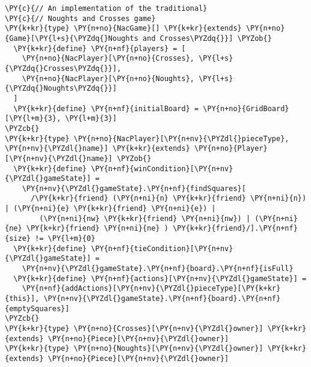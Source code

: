 \begin{Verbatim}[commandchars=\\\{\}]
\PY{c}{// An implementation of the traditional}
\PY{c}{// Noughts and Crosses game}
\PY{k+kr}{type} \PY{n+no}{NacGame}[] \PY{k+kr}{extends} \PY{n+no}{Game}[\PY{l+s}{\PYZdq{}Noughts and Crosses\PYZdq{}}] \PYZob{}
  \PY{k+kr}{define} \PY{n+nf}{players} = [
    \PY{n+no}{NacPlayer}[\PY{n+no}{Crosses}, \PY{l+s}{\PYZdq{}Crosses\PYZdq{}}],
    \PY{n+no}{NacPlayer}[\PY{n+no}{Noughts}, \PY{l+s}{\PYZdq{}Noughts\PYZdq{}}]
  ]
  \PY{k+kr}{define} \PY{n+nf}{initialBoard} = \PY{n+no}{GridBoard}[\PY{l+m}{3}, \PY{l+m}{3}]
\PYZcb{}
\PY{k+kr}{type} \PY{n+no}{NacPlayer}[\PY{n+nv}{\PYZdl{}pieceType}, \PY{n+nv}{\PYZdl{}name}] \PY{k+kr}{extends} \PY{n+no}{Player}[\PY{n+nv}{\PYZdl{}name}] \PYZob{}
  \PY{k+kr}{define} \PY{n+nf}{winCondition}[\PY{n+nv}{\PYZdl{}gameState}] =
    \PY{n+nv}{\PYZdl{}gameState}.\PY{n+nf}{findSquares}[
      /\PY{k+kr}{friend} (\PY{n+ni}{n} \PY{k+kr}{friend} \PY{n+ni}{n}) | (\PY{n+ni}{e} \PY{k+kr}{friend} \PY{n+ni}{e}) |
        (\PY{n+ni}{nw} \PY{k+kr}{friend} \PY{n+ni}{nw}) | (\PY{n+ni}{ne} \PY{k+kr}{friend} \PY{n+ni}{ne} ) \PY{k+kr}{friend}/].\PY{n+nf}{size} != \PY{l+m}{0}
  \PY{k+kr}{define} \PY{n+nf}{tieCondition}[\PY{n+nv}{\PYZdl{}gameState}] =
    \PY{n+nv}{\PYZdl{}gameState}.\PY{n+nf}{board}.\PY{n+nf}{isFull}
  \PY{k+kr}{define} \PY{n+nf}{actions}[\PY{n+nv}{\PYZdl{}gameState}] =
    \PY{n+nf}{addActions}[\PY{n+nv}{\PYZdl{}pieceType}[\PY{k+kr}{this}], \PY{n+nv}{\PYZdl{}gameState}.\PY{n+nf}{board}.\PY{n+nf}{emptySquares}]
\PYZcb{}
\PY{k+kr}{type} \PY{n+no}{Crosses}[\PY{n+nv}{\PYZdl{}owner}] \PY{k+kr}{extends} \PY{n+no}{Piece}[\PY{n+nv}{\PYZdl{}owner}]
\PY{k+kr}{type} \PY{n+no}{Noughts}[\PY{n+nv}{\PYZdl{}owner}] \PY{k+kr}{extends} \PY{n+no}{Piece}[\PY{n+nv}{\PYZdl{}owner}]
\end{Verbatim}
